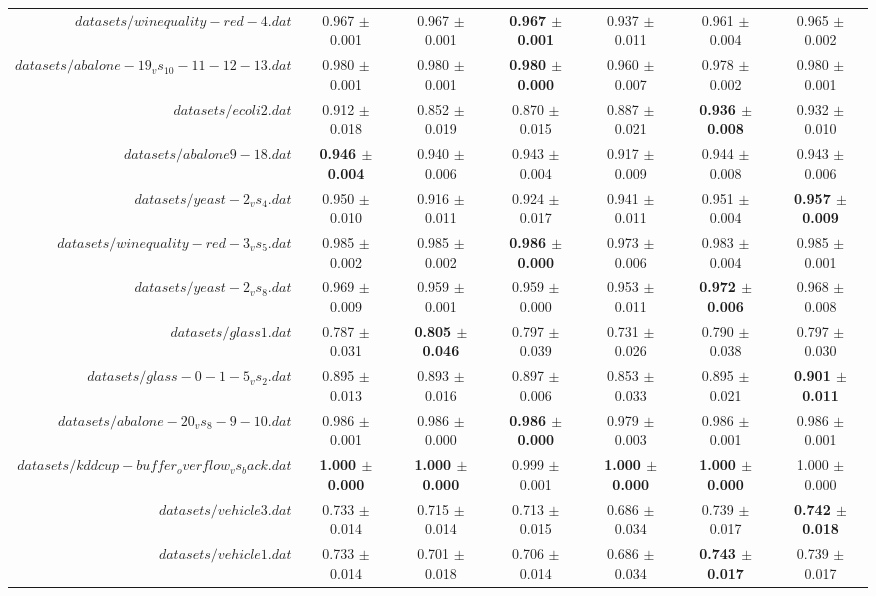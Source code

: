 \begin{table}[!ht]
{\begin{tabular}{r c c c c c c}
$datasets/winequality-red-4.dat$ & 0.967 $\pm$ 0.001 & 0.967 $\pm$ 0.001 & \textbf{0.967 $\pm$ 0.001} & 0.937 $\pm$ 0.011 & 0.961 $\pm$ 0.004 & 0.965 $\pm$ 0.002 \\
$datasets/abalone-19_vs_10-11-12-13.dat$ & 0.980 $\pm$ 0.001 & 0.980 $\pm$ 0.001 & \textbf{0.980 $\pm$ 0.000} & 0.960 $\pm$ 0.007 & 0.978 $\pm$ 0.002 & 0.980 $\pm$ 0.001 \\
$datasets/ecoli2.dat$ & 0.912 $\pm$ 0.018 & 0.852 $\pm$ 0.019 & 0.870 $\pm$ 0.015 & 0.887 $\pm$ 0.021 & \textbf{0.936 $\pm$ 0.008} & 0.932 $\pm$ 0.010 \\
$datasets/abalone9-18.dat$ & \textbf{0.946 $\pm$ 0.004} & 0.940 $\pm$ 0.006 & 0.943 $\pm$ 0.004 & 0.917 $\pm$ 0.009 & 0.944 $\pm$ 0.008 & 0.943 $\pm$ 0.006 \\
$datasets/yeast-2_vs_4.dat$ & 0.950 $\pm$ 0.010 & 0.916 $\pm$ 0.011 & 0.924 $\pm$ 0.017 & 0.941 $\pm$ 0.011 & 0.951 $\pm$ 0.004 & \textbf{0.957 $\pm$ 0.009} \\
$datasets/winequality-red-3_vs_5.dat$ & 0.985 $\pm$ 0.002 & 0.985 $\pm$ 0.002 & \textbf{0.986 $\pm$ 0.000} & 0.973 $\pm$ 0.006 & 0.983 $\pm$ 0.004 & 0.985 $\pm$ 0.001 \\
$datasets/yeast-2_vs_8.dat$ & 0.969 $\pm$ 0.009 & 0.959 $\pm$ 0.001 & 0.959 $\pm$ 0.000 & 0.953 $\pm$ 0.011 & \textbf{0.972 $\pm$ 0.006} & 0.968 $\pm$ 0.008 \\
$datasets/glass1.dat$ & 0.787 $\pm$ 0.031 & \textbf{0.805 $\pm$ 0.046} & 0.797 $\pm$ 0.039 & 0.731 $\pm$ 0.026 & 0.790 $\pm$ 0.038 & 0.797 $\pm$ 0.030 \\
$datasets/glass-0-1-5_vs_2.dat$ & 0.895 $\pm$ 0.013 & 0.893 $\pm$ 0.016 & 0.897 $\pm$ 0.006 & 0.853 $\pm$ 0.033 & 0.895 $\pm$ 0.021 & \textbf{0.901 $\pm$ 0.011} \\
$datasets/abalone-20_vs_8-9-10.dat$ & 0.986 $\pm$ 0.001 & 0.986 $\pm$ 0.000 & \textbf{0.986 $\pm$ 0.000} & 0.979 $\pm$ 0.003 & 0.986 $\pm$ 0.001 & 0.986 $\pm$ 0.001 \\
$datasets/kddcup-buffer_overflow_vs_back.dat$ & \textbf{1.000 $\pm$ 0.000} & \textbf{1.000 $\pm$ 0.000} & 0.999 $\pm$ 0.001 & \textbf{1.000 $\pm$ 0.000} & \textbf{1.000 $\pm$ 0.000} & 1.000 $\pm$ 0.000 \\
$datasets/vehicle3.dat$ & 0.733 $\pm$ 0.014 & 0.715 $\pm$ 0.014 & 0.713 $\pm$ 0.015 & 0.686 $\pm$ 0.034 & 0.739 $\pm$ 0.017 & \textbf{0.742 $\pm$ 0.018} \\
$datasets/vehicle1.dat$ & 0.733 $\pm$ 0.014 & 0.701 $\pm$ 0.018 & 0.706 $\pm$ 0.014 & 0.686 $\pm$ 0.034 & \textbf{0.743 $\pm$ 0.017} & 0.739 $\pm$ 0.017 \\

\end{tabular}}
\end{table}
